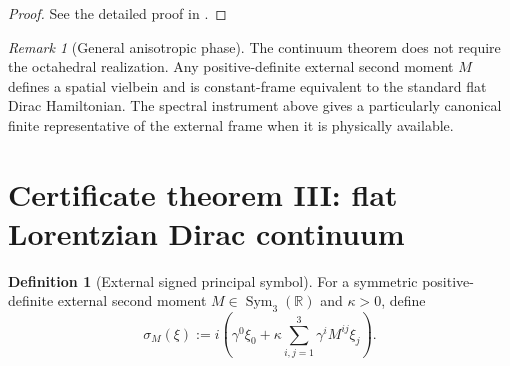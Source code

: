 \documentclass[11pt]{article}
\theoremstyle{definition}
\newtheorem{definition}[theorem]{Definition}
\theoremstyle{remark}
\newtheorem{remark}[theorem]{Remark}
\newcommand{\R}{\mathbb R}
\begin{document}
\begin{proof}
See the detailed proof in .
\end{proof}

\begin{remark}[General anisotropic phase]
The continuum theorem does not require the octahedral realization.  Any
positive-definite external second moment $M$ defines a spatial vielbein and is
constant-frame equivalent to the standard flat Dirac Hamiltonian.  The
spectral instrument above gives a particularly canonical finite representative
of the external frame when it is physically available.
\end{remark}

\section{Certificate theorem III: flat Lorentzian Dirac continuum}

\begin{definition}[External signed principal symbol]
For a symmetric positive-definite external second moment
$M\in\operatorname{Sym}_3(\R)$ and $\kappa>0$, define
\[
 \sigma_M(\xi)
 :=i\left(\gamma^0\xi_0+
          \kappa\sum_{i,j=1}^3\gamma^iM^{ij}\xi_j\right).
\]
\end{definition}
\end{document}
